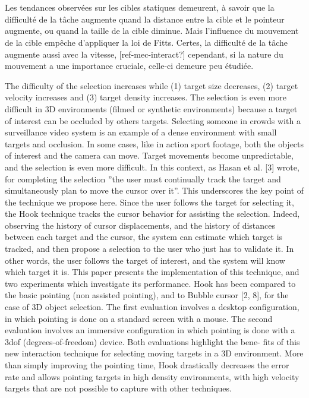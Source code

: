 	
	
	\section{}
    
	Les tendances observées sur les cibles statiques demeurent, à savoir que la difficulté de la tâche augmente quand la distance entre la cible et le pointeur augmente, ou quand la taille de la cible diminue. Mais l'influence du mouvement de la cible empêche d'appliquer la loi de Fitts. Certes, la difficulté de la tâche augmente aussi avec la vitesse, [ref-mec-interact?] cependant, si la nature du mouvement a une importance cruciale, celle-ci demeure peu étudiée.
    
    
    
    
 The
difficulty of the selection increases while (1) target size decreases,
(2) target velocity increases and (3) target density increases. The
selection is even more difficult in 3D environments (filmed or synthetic
environments) because a target of interest can be occluded
by others targets. Selecting someone in crowds with a surveillance
video system is an example of a dense environment with small targets
and occlusion. In some cases, like in action sport footage, both
the objects of interest and the camera can move. Target movements
become unpredictable, and the selection is even more difficult.
In this context, as Hasan et al. [3] wrote, for completing the
selection ”the user must continually track the target and simultaneously
plan to move the cursor over it”. This underscores the key
point of the technique we propose here. Since the user follows the
target for selecting it, the Hook technique tracks the cursor behavior
for assisting the selection. Indeed, observing the history of cursor
displacements, and the history of distances between each target and
the cursor, the system can estimate which target is tracked, and then
propose a selection to the user who just has to validate it. In other
words, the user follows the target of interest, and the system will
know which target it is.
This paper presents the implementation of this technique, and
two experiments which investigate its performance. Hook has been
compared to the basic pointing (non assisted pointing), and to Bubble
cursor [2, 8], for the case of 3D object selection. The first evaluation
involves a desktop configuration, in which pointing is done
on a standard screen with a mouse. The second evaluation involves
an immersive configuration in which pointing is done with a 3dof
(degrees-of-freedom) device. Both evaluations highlight the bene-
fits of this new interaction technique for selecting moving targets in
a 3D environment. More than simply improving the pointing time,
Hook drastically decreases the error rate and allows pointing targets
in high density environments, with high velocity targets that are not
possible to capture with other techniques.


	
		

\clearpage
